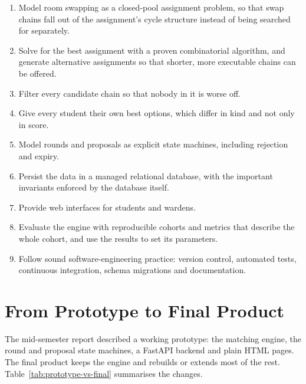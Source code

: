 \begin{enumerate}
  \item Model room swapping as a closed-pool assignment problem, so that
  swap chains fall out of the assignment's cycle structure instead of
  being searched for separately.
  \item Solve for the best assignment with a proven combinatorial
  algorithm, and generate alternative assignments so that shorter, more
  executable chains can be offered.
  \item Filter every candidate chain so that nobody in it is worse off.
  \item Give every student their own best options, which differ in kind
  and not only in score.
  \item Model rounds and proposals as explicit state machines, including
  rejection and expiry.
  \item Persist the data in a managed relational database, with the
  important invariants enforced by the database itself.
  \item Provide web interfaces for students and wardens.
  \item Evaluate the engine with reproducible cohorts and metrics that
  describe the whole cohort, and use the results to set its parameters.
  \item Follow sound software-engineering practice: version control,
  automated tests, continuous integration, schema migrations and
  documentation.
\end{enumerate}

\section{From Prototype to Final Product}

The mid-semester report described a working prototype: the matching
engine, the round and proposal state machines, a FastAPI backend and
plain HTML pages. The final product keeps the engine and rebuilds or
extends most of the rest. Table~\ref{tab:prototype-vs-final} summarises
the changes.

